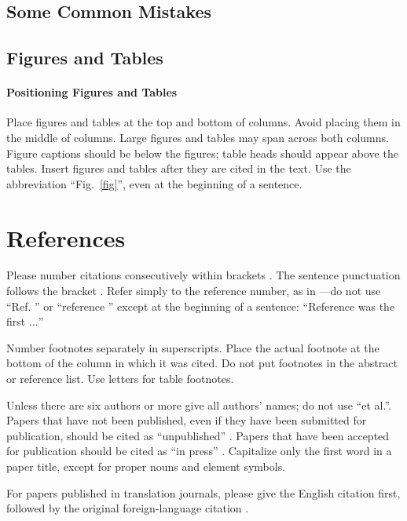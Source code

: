 \documentclass[conference]{IEEEtran}
\begin{document}
\subsection{Some Common Mistakes}\label{SCM}

\subsection{Figures and Tables}
\paragraph{Positioning Figures and Tables} Place figures and tables at the top and 
bottom of columns. Avoid placing them in the middle of columns. Large 
figures and tables may span across both columns. Figure captions should be 
below the figures; table heads should appear above the tables. Insert 
figures and tables after they are cited in the text. Use the abbreviation 
``Fig.~\ref{fig}'', even at the beginning of a sentence.

\section*{References}

Please number citations consecutively within brackets \cite{b1}. The 
sentence punctuation follows the bracket \cite{b2}. Refer simply to the reference 
number, as in \cite{b3}---do not use ``Ref. \cite{b3}'' or ``reference \cite{b3}'' except at 
the beginning of a sentence: ``Reference \cite{b3} was the first $\ldots$''

Number footnotes separately in superscripts. Place the actual footnote at 
the bottom of the column in which it was cited. Do not put footnotes in the 
abstract or reference list. Use letters for table footnotes.

Unless there are six authors or more give all authors' names; do not use 
``et al.''. Papers that have not been published, even if they have been 
submitted for publication, should be cited as ``unpublished'' \cite{b4}. Papers 
that have been accepted for publication should be cited as ``in press'' \cite{b5}. 
Capitalize only the first word in a paper title, except for proper nouns and 
element symbols.

For papers published in translation journals, please give the English 
citation first, followed by the original foreign-language citation \cite{b6}.
\end{document}
